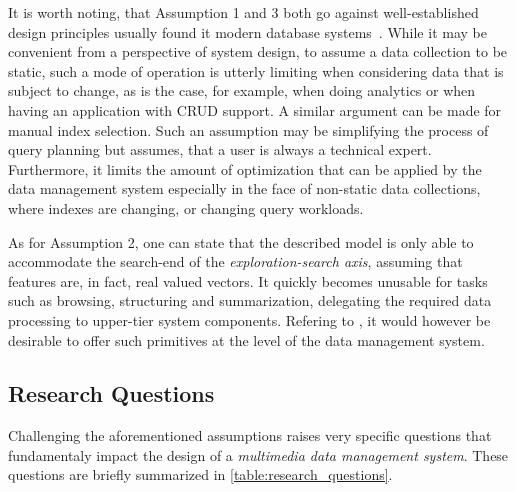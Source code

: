 It is worth noting, that Assumption 1 and 3 both go against well-established design principles usually found it modern database systems~\cite{Petrov:2019Database}.  While it may be convenient from a perspective of system design, to assume a data collection to be static, such a mode of operation is utterly limiting when considering data that is subject to change, as is the case, for example, when doing analytics or when having an application with CRUD support. A similar argument can be made for manual index selection. Such an assumption may be simplifying the process of query planning but assumes, that a user is always a technical expert. Furthermore, it limits the amount of optimization that can be applied by the data management system especially in the face of non-static data collections, where indexes are changing, or changing query workloads. 

As for Assumption 2, one can state that the described model is only able to accommodate the search-end of the \emph{exploration-search axis}, assuming that features are, in fact, real valued vectors. It quickly becomes unusable for tasks such as browsing, structuring and summarization, delegating the required data processing to upper-tier system components. Refering to \cite{Jonson:2016}, it would however be desirable to offer such primitives at the level of the data management system.


\subsection{Research Questions}

Challenging the aforementioned assumptions raises very specific questions that fundamentaly impact the design of a \emph{multimedia data management system}. These questions are briefly summarized in \cref{table:research_questions}.

